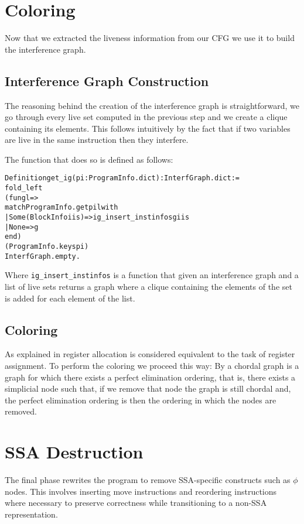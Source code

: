 \section{Coloring}
\label{sec:coloring}

Now that we extracted the liveness information from our CFG we use it to build the interference graph.

\subsection{Interference Graph Construction}

The reasoning behind the creation of the interference graph is straightforward, we go through every live set computed in the previous step and we create a clique containing its elements. This follows intuitively by the fact that if two variables are live in the same instruction then they interfere.

The function that does so is defined as follows:

\begin{alltt}
Definition get_ig (pi : ProgramInfo.dict) : InterfGraph.dict :=
  fold_left
    (fun g l =>
      match ProgramInfo.get pi l with
      | Some (BlockInfo iis) => ig_insert_instinfos g iis
      | None => g
      end)
    (ProgramInfo.keys pi)
    InterfGraph.empty.
\end{alltt}

Where \texttt{ig\_insert\_instinfos} is a function that given an interference graph and a list of live sets returns a graph where a clique containing the elements of the set is added for each element of the list.

\subsection{Coloring}

As explained in  register allocation is considered equivalent to the task of register assignment.
To perform the coloring we proceed this way:
By  a chordal graph is a graph for which there exists a perfect elimination ordering, that is, there exists a simplicial node such that, if we remove that node the graph is still chordal and, the perfect elimination ordering is then the ordering in which the nodes are removed.

\section{SSA Destruction}
\label{sec:destruct}

The final phase rewrites the program to remove SSA-specific constructs such as $\phi$ nodes. This involves inserting move instructions and reordering instructions where necessary to preserve correctness while transitioning to a non-SSA representation.
